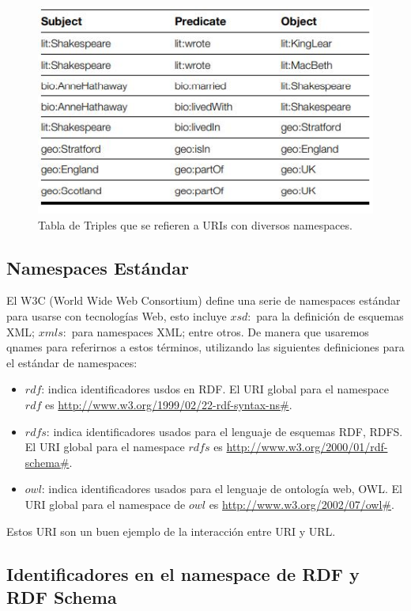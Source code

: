 \documentclass[conference]{IEEEtran}
\begin{document}
\begin{figure}[H]
\centering
\includegraphics[scale=0.75]{img/RDF escrit R.JPG}
\caption{Tabla de Triples que se refieren a URIs con diversos namespaces. \cite{b1}}
\end{figure}

\subsection{Namespaces Estándar}

El W3C (World Wide Web Consortium) define una serie de namespaces estándar para usarse con tecnologías Web, esto incluye $xsd:$ para la definición de esquemas XML; $xmls:$ para namespaces XML; entre otros.
De manera que usaremos qnames para referirnos a estos términos, utilizando las siguientes definiciones para el estándar de namespaces:

\begin{itemize}
    \item $rdf$: indica identificadores usdos en RDF. El URI global para el namespace $rdf$ es \url{http://www.w3.org/1999/02/22-rdf-syntax-ns\#}\cite{b2}.
    \item $rdfs$: indica identificadores usados para el lenguaje de esquemas RDF, RDFS. El URI global para el namespace $rdfs$ es \url{http://www.w3.org/2000/01/rdf-schema\#}\cite{b3}.
    \item $owl$: indica identificadores usados para el lenguaje de ontología web, OWL. El URI global para el namespace de $owl$ es \url{http://www.w3.org/2002/07/owl\#}\cite{b4}.
\end{itemize}

Estos URI son un buen ejemplo de la interacción entre URI y URL.

\subsection{Identificadores en el namespace de RDF y RDF Schema}
\end{document}
